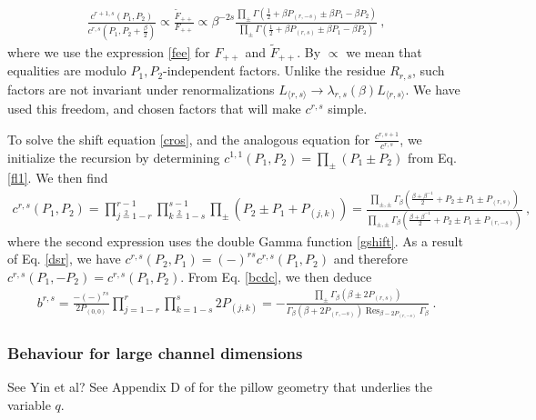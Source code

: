 \documentclass[12pt, a4paper]{article}
\theoremstyle{break}
\begin{document}
\begin{align}
 \frac{c^{r+1,s}(P_1,P_2)}{c^{r,s}(P_1,P_2+\frac{\beta}{2})} \propto \frac{\widetilde{F}_{++}}{F_{++}} \propto \beta^{-2s}\frac{\prod_{\pm} \Gamma(\frac12+\beta P_{(r,-s)} \pm \beta P_1 -\beta P_2)}{\prod_{\pm} \Gamma(\frac12+\beta P_{(r,s)} \pm \beta P_1 -\beta P_2)} \ , 
 \label{cros}
\end{align}
where we use the expression \eqref{fee} for $F_{++}$ and $\widetilde{F}_{++}$. By $\propto$ we mean that equalities are modulo $P_1,P_2$-independent factors. Unlike the residue $R_{r,s}$, such factors are not invariant under renormalizations $L_{\langle r,s\rangle} \to \lambda_{r,s}(\beta)L_{\langle r,s\rangle}$. We have used this freedom, and chosen factors that will make $c^{r,s}$ simple. 

To solve the shift equation \eqref{cros}, and the analogous equation for $\frac{c^{r,s+1}}{c ^{r,s}}$, we initialize the recursion by determining $c^{1,1}(P_1,P_2) =\prod_\pm (P_1\pm P_2) $ from Eq. \eqref{fl1}. We then find 
\begin{align}
 c^{r,s}(P_1,P_2) = \prod_{j\overset{2}{=}1-r}^{r-1} \prod_{k\overset{2}{=}1-s}^{s-1} \prod_\pm \left(P_2\pm P_1+ P_{(j,k)}\right) = \frac{\prod_{\pm,\pm}\Gamma_\beta\left(\frac{\beta+\beta^{-1}}{2} +P_2\pm P_1 \pm P_{(r,s)}\right)}
 {\prod_{\pm,\pm}\Gamma_\beta\left(\frac{\beta+\beta^{-1}}{2} +P_2\pm P_1 \pm P_{(r,-s)}\right)}\ , 
 \label{crs}
\end{align}
where the second expression uses the double Gamma function \eqref{gshift}. As a result of Eq. \eqref{dsr}, we have $c^{r,s}(P_2,P_1)=(-)^{rs} c^{r,s}(P_1,P_2)$ and therefore $c^{r,s}(P_1,-P_2)=c^{r,s}(P_1,P_2)$. From Eq. \eqref{bcdc}, we then deduce 
\begin{align}
 b^{r,s} = \frac{-(-)^{rs}}{2P_{(0,0)}} \prod_{j=1-r}^r\prod_{k=1-s}^s 2P_{(j,k)} = -
 \frac{\prod_\pm \Gamma_\beta\left(\beta \pm 2P_{(r,s)}\right)}{\Gamma_\beta\left(\beta+2P_{(r,-s)}\right)\operatorname{Res}_{\beta-2P_{(r,-s)}}\Gamma_\beta}\ .
 \label{brs}
\end{align}

\subsubsection{Behaviour for large channel dimensions}

See Yin et al? See Appendix D of \cite{msz15} for the pillow geometry that underlies the variable $q$.
\end{document}
